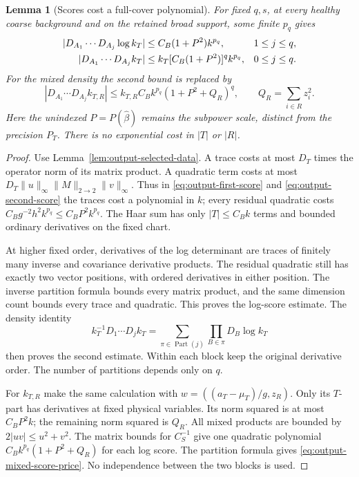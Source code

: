 \documentclass[11pt,reqno]{amsart}
\numberwithin{equation}{section}
\newtheorem{lemma}[theorem]{Lemma}
\theoremstyle{definition}
\theoremstyle{remark}
\begin{document}
\begin{lemma}[Scores cost a full-cover polynomial]
\label{lem:output-score-bounds}
For fixed \(q,s\), at every healthy coarse background and on
the retained broad support, some finite \(p_q\) gives
\begin{align}
 |D_{A_1}\cdots D_{A_j}\log k_T|
              &\le C_B(1+P^2)k^{p_q},&&1\le j\le q,\notag\\
 |D_{A_1}\cdots D_{A_j}k_T|
              &\le k_T[C_B(1+P^2)]^q k^{p_q},&&0\le j\le q.
 \label{eq:output-pure-score-price}
\end{align}
For the mixed density the second bound is replaced by
\begin{equation}
 |D_{A_1}\cdots D_{A_j}k_{T,R}|
       \le k_{T,R} C_Bk^{p_q}(1+P^2+Q_R)^q,
                      \qquad Q_R=\sum_{i\in R}z_i^2.
 \label{eq:output-mixed-score-price}
\end{equation}
Here the unindexed \(P=P(\widehat\beta)\) remains the
subpower scale, distinct from the precision \(P_T\).
There is no exponential cost in \(|T|\) or \(|R|\).
\end{lemma}
\begin{proof}
Use Lemma~\ref{lem:output-selected-data}. A trace costs at
most \(D_T\) times the operator norm of its matrix product.
A quadratic term costs at most
\(D_T\|u\|_\infty\|M\|_{2\to2}\|v\|_\infty\).
Thus in \eqref{eq:output-first-score} and
\eqref{eq:output-second-score} the traces cost a polynomial
in \(k\); every residual quadratic costs
\(C_Bg^{-2}h^2k^{p_q}\le C_BP^2k^{p_q}\).
The Haar sum has only \(|T|\le C_Bk\) terms and bounded
ordinary derivatives on the fixed chart.

At higher fixed order, derivatives of the log determinant
are traces of finitely many inverse and covariance derivative
products. The residual quadratic still has exactly two vector
positions, with ordered derivatives in either position. The
inverse partition formula bounds every matrix product, and
the same dimension count bounds every trace and quadratic.
This proves the log-score estimate. The density identity
\begin{equation}
 k_T^{-1}D_1\cdots D_jk_T
       =\sum_{\pi\in\operatorname{Part}(j)}
                           \prod_{B\in\pi}D_B\log k_T
 \label{eq:output-density-partitions}
\end{equation}
then proves the second estimate. Within each block keep the
original derivative order. The number of partitions depends
only on \(q\).

For \(k_{T,R}\) make the same calculation with
\(w=((a_T-\mu_T)/g,z_R)\). Only its \(T\)-part has
derivatives at fixed physical variables. Its norm squared is
at most \(C_B P^2 k\); the remaining norm squared is \(Q_R\).
All mixed products are bounded by \(2|uv|\le u^2+v^2\).
The matrix bounds for \(C_S^{-1}\) give one quadratic
polynomial \(C_Bk^{p_q}(1+P^2+Q_R)\) for each log score.
The partition formula gives \eqref{eq:output-mixed-score-price}.
No independence between the two blocks is used.
\end{proof}
\end{document}
